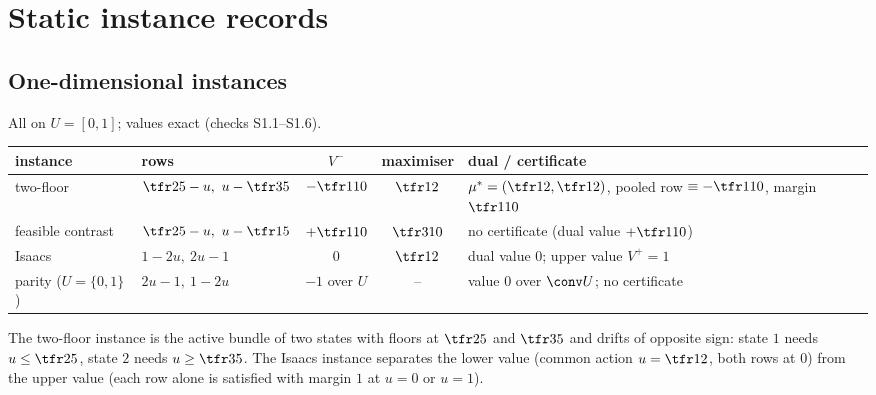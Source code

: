 \section{Static instance records}\label{si:static}

\subsection{One-dimensional instances}
All on $U=[0,1]$; values exact (checks S1.1--S1.6).
\begin{center}\footnotesize
\begin{tabularx}{\textwidth}{llcc>{\raggedright\arraybackslash}X}
\toprule
instance & rows & $V^-$ & maximiser & dual / certificate\\
\midrule
two-floor & $\tfr25-u,\ u-\tfr35$ & $-\tfr1{10}$ & $\tfr12$ & $\mu^\ast=(\tfr12,\tfr12)$, pooled row $\equiv-\tfr1{10}$, margin $\tfr1{10}$\\
feasible contrast & $\tfr25-u,\ u-\tfr15$ & $+\tfr1{10}$ & $\tfr3{10}$ & no certificate (dual value $+\tfr1{10}$)\\
Isaacs & $1-2u,\ 2u-1$ & $0$ & $\tfr12$ & dual value $0$; upper value $V^+=1$\\
parity ($U=\{0,1\}$) & $2u-1,\ 1-2u$ & $-1$ over $U$ & -- & value $0$ over $\conv U$; no certificate\\
\bottomrule
\end{tabularx}
\end{center}
The two-floor instance is the active bundle of two states with floors at $\tfr25$ and $\tfr35$ and drifts of opposite sign: state $1$ needs $u\le\tfr25$, state $2$ needs $u\ge\tfr35$. The Isaacs instance separates the lower value (common action $u=\tfr12$, both rows at $0$) from the upper value (each row alone is satisfied with margin $1$ at $u=0$ or $u=1$).

